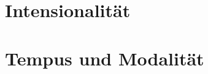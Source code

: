 \documentclass[handout,aspectratio=1610,dvipsnames]{beamer}
\begin{document}
  \section[Intensionalität]{Intensionalität}
  \let\woopsi\section\let\section\subsection\let\subsection\subsubsection
  
  \let\subsection\section\let\section\woopsi

  \section[Tempus und Modalität]{Tempus und Modalität}
  \let\woopsi\section\let\section\subsection\let\subsection\subsubsection
  
  \let\subsection\section\let\section\woopsi
\end{document}
